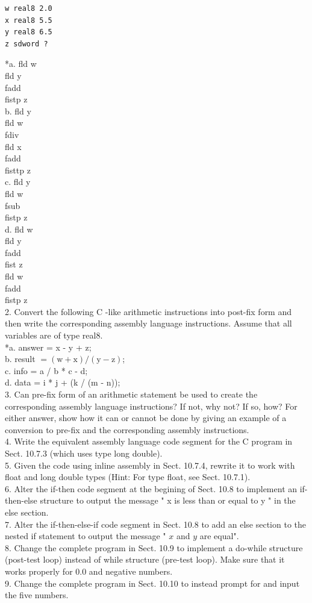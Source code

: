 \documentclass[10pt]{article}
\begin{document}
\begin{verbatim}
w real8 2.0
x real8 5.5
y real8 6.5
z sdword ?
\end{verbatim}

*a. fld w\\
fld y\\
fadd\\
fistp z\\
b. fld y\\
fld w\\
fdiv\\
fld x\\
fadd\\
fisttp z\\
c. fld y\\
fld w\\
fsub\\
fistp z\\
d. fld w\\
fld y\\
fadd\\
fist z\\
fld w\\
fadd\\
fistp z\\
2. Convert the following C -like arithmetic instructions into post-fix form and then write the corresponding assembly language instructions. Assume that all variables are of type real8.\\
*a. answer = x - y + z;\\
b. result $=(\mathrm{w}+\mathrm{x}) /(\mathrm{y}-\mathrm{z})$;\\
c. info = a / b * c - d;\\
d. data = i * j + (k / (m - n));\\
3. Can pre-fix form of an arithmetic statement be used to create the corresponding assembly language instructions? If not, why not? If so, how? For either answer, show how it can or cannot be done by giving an example of a conversion to pre-fix and the corresponding assembly instructions.\\
4. Write the equivalent assembly language code segment for the C program in Sect. 10.7.3 (which uses type long double).\\
5. Given the code using inline assembly in Sect. 10.7.4, rewrite it to work with float and long double types (Hint: For type float, see Sect. 10.7.1).\\
6. Alter the if-then code segment at the begining of Sect. 10.8 to implement an if-then-else structure to output the message " x is less than or equal to y " in the else section.\\
7. Alter the if-then-else-if code segment in Sect. 10.8 to add an else section to the nested if statement to output the message " $x$ and $y$ are equal".\\
8. Change the complete program in Sect. 10.9 to implement a do-while structure (post-test loop) instead of while structure (pre-test loop). Make sure that it works properly for 0.0 and negative numbers.\\
9. Change the complete program in Sect. 10.10 to instead prompt for and input the five numbers.
\end{document}
